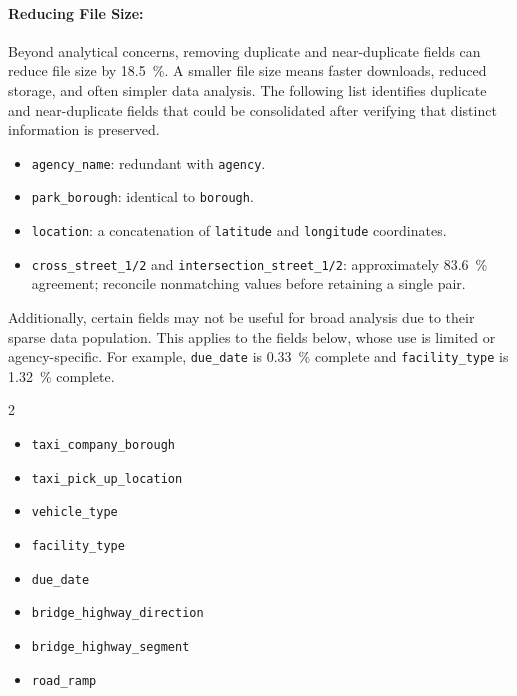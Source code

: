 \documentclass[linenumber]{jdsart}
\begin{document}
\paragraph{Reducing File Size:}
\label{par:filesize}
Beyond analytical concerns, removing duplicate and near-duplicate fields 
can reduce file size by \SI{18.5}{\percent}. A smaller file size 
means faster downloads, reduced storage, and often simpler data analysis. 
The following list identifies duplicate and near-duplicate fields that 
could be consolidated after verifying that distinct information is preserved.


\begin{itemize}[left=1.5em,itemsep=0.1\baselineskip]
  \item \texttt{agency\_name}: redundant with \texttt{agency}.
  \item \texttt{park\_borough}: identical to \texttt{borough}.
  \item \texttt{location}: a concatenation of \texttt{latitude} and \texttt{longitude} coordinates.
  \item \texttt{cross\_street\_1/2} and \texttt{intersection\_street\_1/2}: 
 approximately \SI{83.6}{\percent} agreement; reconcile nonmatching values before retaining a single pair.

\end{itemize}

Additionally, certain fields may not be useful for broad analysis
due to their sparse data population. This applies to the fields 
below, whose use is limited or agency-specific. For example,
\texttt{due\_date} is \SI{0.33}{\percent} complete and
\texttt{facility\_type} is \SI{1.32}{\percent} complete.

\begin{multicols}{2}
\begin{itemize}[left=1.5em]
    \item \texttt{taxi\_company\_borough}
    \item \texttt{taxi\_pick\_up\_location}
    \item \texttt{vehicle\_type}
    \item \texttt{facility\_type}
    \item \texttt{due\_date}
    \item \texttt{bridge\_highway\_direction}
    \item \texttt{bridge\_highway\_segment}
    \item \texttt{road\_ramp}
\end{itemize}
\end{multicols}
\end{document}
